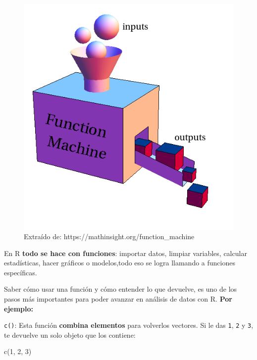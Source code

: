\documentclass[
  letterpaper,
  DIV=11,
  numbers=noendperiod,
  twoside]{scrreprt}
\newenvironment{Shaded}{\begin{snugshade}}{\end{snugshade}}
\newcommand{\DecValTok}[1]{\textcolor[rgb]{0.68,0.00,0.00}{#1}}
\newcommand{\FunctionTok}[1]{\textcolor[rgb]{0.28,0.35,0.67}{#1}}
\newcommand{\NormalTok}[1]{\textcolor[rgb]{0.00,0.23,0.31}{#1}}
\begin{document}
\begin{figure}[H]

{\centering \includegraphics[width=5.05208in,height=\textheight]{images/clipboard-1257493817.png}

}

\caption{Extraído de: https://mathinsight.org/function\_machine}

\end{figure}%

En R \textbf{todo se hace con funciones}: importar datos, limpiar
variables, calcular estadísticas, hacer gráficos o modelos,todo eso se
logra llamando a funciones específicas.

Saber cómo usar una función y cómo entender lo que devuelve, es uno de
los pasos más importantes para poder avanzar en análisis de datos con R.
\textbf{Por ejemplo:}

\texttt{c()}: Esta función \textbf{combina elementos} para volverlos
vectores. Si le das \texttt{1}, \texttt{2} y \texttt{3}, te devuelve un
solo objeto que los contiene:

\begin{Shaded}
\begin{Highlighting}[]
\FunctionTok{c}\NormalTok{(}\DecValTok{1}\NormalTok{, }\DecValTok{2}\NormalTok{, }\DecValTok{3}\NormalTok{) }
\end{Highlighting}
\end{Shaded}
\end{document}
